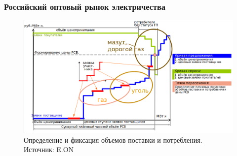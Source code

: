 \documentclass[c, dvipsnames]{beamer}  %
\begin{document}
\begin{frame}[shrink=5]
\frametitle{Российский оптовый рынок электричества} 

\begin{figure}
	\centering
	\includegraphics[width=1\linewidth]{screenshot021}
	\caption{ Определение и фиксация объемов поставки и потребления. Источник: E.ON }
	\label{fig:screenshot015}
\end{figure}




\end{frame}
\end{document}
